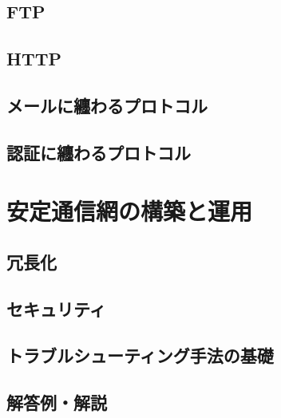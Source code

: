 \documentclass[a4j,12pt]{jreport}
\makeatletter
\newcommand{\beginappendix}{
  \setcounter{chapter}{0}
  \renewcommand{\prechaptername}{付録}
  \renewcommand{\postchaptername}{} 
  \renewcommand{\thechapter}{\@Alph\c@chapter}
  \renewcommand{\thesection}{\@Alph\c@chapter.\@arabic\c@section}
  \renewcommand{\thesubsection}{\@Alph\c@chapter.\@arabic\c@section.\@arabic\c@subsection}
}
\makeatother
\begin{document}
\chapter{FTP}

\chapter{HTTP}

\chapter{メールに纏わるプロトコル} %

\chapter{認証に纏わるプロトコル} %


\part{安定通信網の構築と運用}

\chapter{冗長化}

\chapter{セキュリティ}

\chapter{トラブルシューティング手法の基礎}


\beginappendix
\chapter{解答例・解説}


%

%

%

%

\printindex
\end{document}
